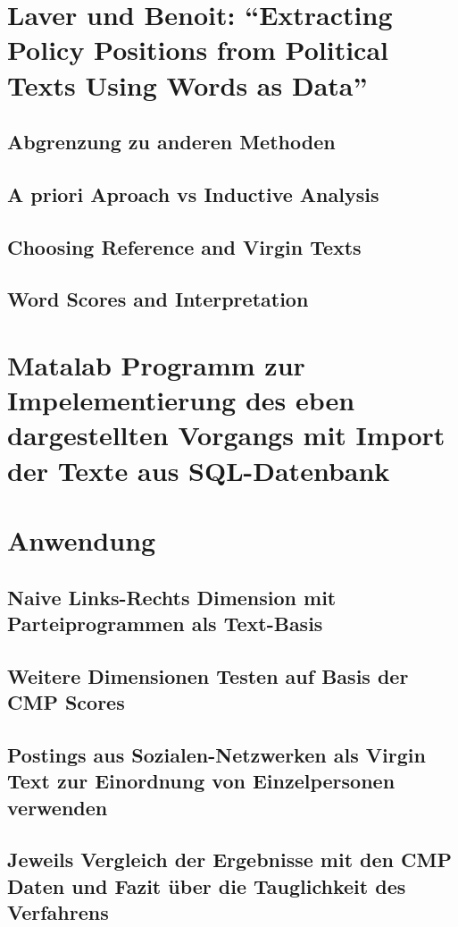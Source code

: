 
\section{Laver und Benoit: \enquote{Extracting Policy Positions from Political Texts Using Words as Data}  }
  \subsection{Abgrenzung zu anderen Methoden}
  \subsection{A priori Aproach vs Inductive Analysis}
  \subsection{Choosing Reference and Virgin Texts}
  \subsection{Word Scores and Interpretation}
  
\section{Matalab Programm zur Impelementierung des eben dargestellten Vorgangs mit Import der Texte aus SQL-Datenbank}

\section{Anwendung}
    \subsection{Naive Links-Rechts Dimension mit Parteiprogrammen als Text-Basis}
    \subsection{Weitere Dimensionen Testen auf Basis der CMP Scores}
    \subsection{Postings aus Sozialen-Netzwerken als Virgin Text zur Einordnung von Einzelpersonen verwenden}
    \subsection{Jeweils Vergleich der Ergebnisse mit den CMP Daten und Fazit über die Tauglichkeit des Verfahrens}

